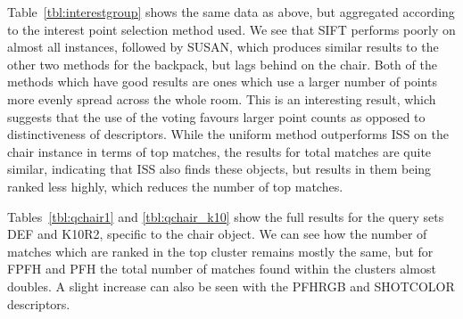 \documentclass[11pt,a4paper]{kth-mag}
\begin{document}
Table~\ref{tbl:interestgroup} shows the same data as above, but aggregated
according to the interest point selection method used. We see that SIFT performs
poorly on almost all instances, followed by SUSAN, which produces similar
results to the other two methods for the backpack, but lags behind on the chair.
Both of the methods which have good results are ones which use a larger number
of points more evenly spread across the whole room. This is an interesting
result, which suggests that the use of the voting favours larger point counts as
opposed to distinctiveness of descriptors. While the uniform method outperforms
ISS on the chair instance in terms of top matches, the results for total matches
are quite similar, indicating that ISS also finds these objects, but results in
them being ranked less highly, which reduces the number of top matches.

Tables~\ref{tbl:qchair1} and \ref{tbl:qchair_k10} show the full results for the
query sets DEF and K10R2, specific to the chair object. We can see how the
number of matches which are ranked in the top cluster remains mostly the same,
but for FPFH and PFH the total number of matches found within the clusters
almost doubles. A slight increase can also be seen with the PFHRGB and SHOTCOLOR
descriptors.
\end{document}
